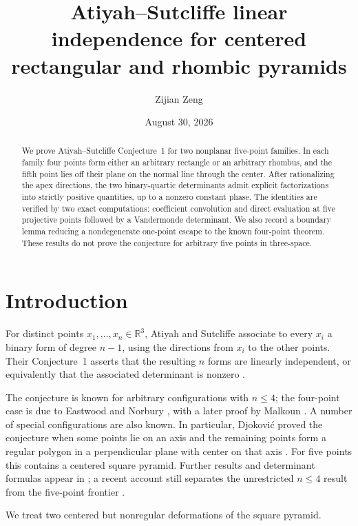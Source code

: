 \documentclass[11pt]{amsart}
\title[Atiyah--Sutcliffe linear independence for two pyramid families]
{Atiyah--Sutcliffe linear independence for centered rectangular and rhombic pyramids}
\author{Zijian Zeng}
\date{August 30, 2026}
\theoremstyle{definition}
\newcommand{\R}{\mathbb{R}}
\begin{document}
\begin{abstract}
We prove Atiyah--Sutcliffe Conjecture~1 for two nonplanar five-point
families. In each family four points form either an arbitrary rectangle or
an arbitrary rhombus, and the fifth point lies off their plane on the normal
line through the center. After rationalizing the apex directions, the two
binary-quartic determinants admit explicit factorizations into strictly
positive quantities, up to a nonzero constant phase. The identities are
verified by two exact computations: coefficient convolution and direct
evaluation at five projective points followed by a Vandermonde determinant.
We also record a boundary lemma reducing a nondegenerate one-point escape to
the known four-point theorem. These results do not prove the conjecture for
arbitrary five points in three-space.
\end{abstract}

\maketitle

\section{Introduction}

For distinct points $x_1,\ldots,x_n\in\R^3$, Atiyah and Sutcliffe associate
to every $x_i$ a binary form of degree $n-1$, using the directions from
$x_i$ to the other points. Their Conjecture~1 asserts that the resulting
$n$ forms are linearly independent, or equivalently that the associated
determinant is nonzero \cite{AtiyahSutcliffe2002}.

The conjecture is known for arbitrary configurations with $n\leq4$;
the four-point case is due to Eastwood and Norbury
\cite{EastwoodNorbury2001}, with a later proof by Malkoun
\cite{Malkoun2023}. A number of special configurations are also known.
In particular, Djokovi\'c proved the conjecture when some points lie on an
axis and the remaining points form a regular polygon in a perpendicular
plane with center on that axis \cite{Djokovic2002}. For five points this
contains a centered square pyramid. Further results and determinant
formulas appear in \cite{MazurPetrenko2012,Malkoun2019}; a recent account
still separates the unrestricted $n\leq4$ result from the five-point
frontier \cite{Malkoun2026}.

We treat two centered but nonregular deformations of the square pyramid.
\end{document}
